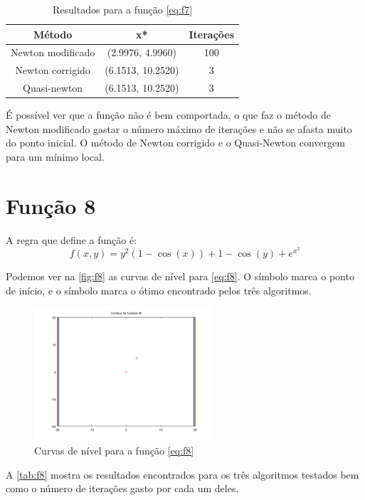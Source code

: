 \documentclass[12pt]{article}
\begin{document}
\begin{table}[H]
\centering
\begin{tabular}{*3c}
\toprule
Método			&	x*		&	Iterações\\
\midrule
Newton modificado	&	(2.9976, 4.9960)	&	100\\
Newton corrigido	&	(6.1513, 10.2520)	&	3\\
Quasi-newton		&	(6.1513, 10.2520)	&	3\\
\bottomrule
\end{tabular}
\caption{\small{Resultados para a função \autoref{eq:f7} }}
\label{tab:f7}
\end{table}

É possível ver que a função não é bem comportada, o que faz o método de Newton modificado gastar o número máximo de iterações e não se afasta muito
do ponto inicial. O método de Newton corrigido e o Quasi-Newton convergem para um mínimo local.

\section{Função 8}
A regra que define a função é:
\begin{equation}
\label{eq:f8}
f(x, y) = y^2(1-\cos(x)) + 1 -\cos(y) + e^{x^2}
\end{equation}

Podemos ver na \autoref{fig:f8} as curvas de nível para \autoref{eq:f8}. O símbolo \textit{\textopenbullet} marca o ponto de início,
e o símbolo \textit{\texttimes} marca o ótimo encontrado pelos três algoritmos.

\begin{figure}[H]
  \centering
  \includegraphics[width=250px]{../matlab/images/f8_contour}
  \caption{Curvas de nível para a função \autoref{eq:f8}}
  \label{fig:f8}
\end{figure}

A \autoref{tab:f8} mostra os resultados encontrados para os três algoritmos testados bem como o número de iterações gasto por cada um deles.
\end{document}
